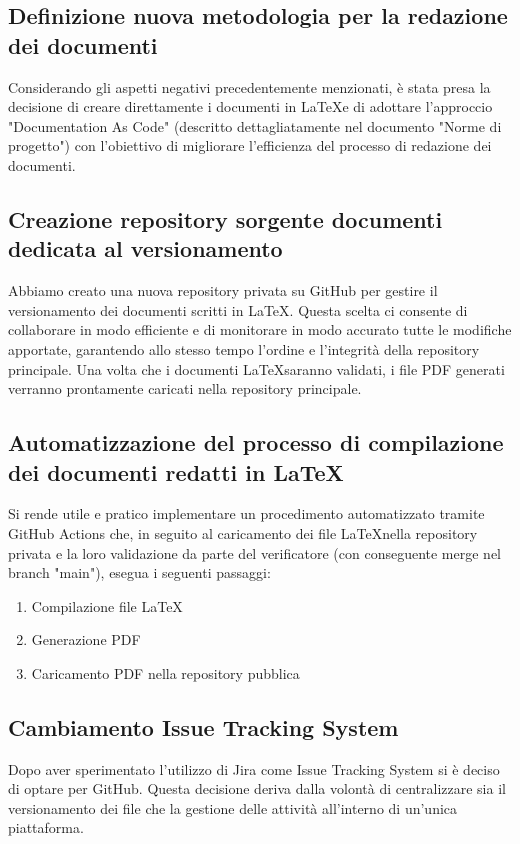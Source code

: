 \documentclass{article}
\begin{document}
    \subsection{Definizione nuova metodologia per la redazione dei documenti}
    Considerando gli aspetti negativi precedentemente menzionati, è stata presa la decisione di creare direttamente i documenti in \LaTeX e di adottare l'approccio "Documentation As Code" (descritto dettagliatamente nel documento "Norme di progetto") con l'obiettivo di migliorare l'efficienza del processo di redazione dei documenti.
    \subsection{Creazione repository sorgente documenti dedicata al versionamento}
    Abbiamo creato una nuova repository privata su GitHub per gestire il versionamento dei documenti scritti in \LaTeX. Questa scelta ci consente di collaborare in modo efficiente e di monitorare in modo accurato tutte le modifiche apportate, garantendo allo stesso tempo l'ordine e l'integrità della repository principale. Una volta che i documenti \LaTeX saranno validati, i file PDF generati verranno prontamente caricati nella repository principale.

    \subsection{Automatizzazione del processo di compilazione dei documenti redatti in \LaTeX}
    Si rende utile e pratico implementare un procedimento automatizzato tramite GitHub Actions che, in seguito al caricamento dei file \LaTeX nella repository privata e la loro validazione da parte del verificatore (con conseguente merge nel branch "main"), esegua i seguenti passaggi:
    \begin{enumerate}
        \item Compilazione file \LaTeX
        \item Generazione PDF
        \item Caricamento PDF nella repository pubblica        
    \end{enumerate}

    \subsection{Cambiamento Issue Tracking System}
    Dopo aver sperimentato l’utilizzo di Jira come Issue Tracking System si è deciso di optare per GitHub. Questa decisione deriva dalla volontà di centralizzare sia il versionamento dei file che la gestione delle attività all'interno di un'unica piattaforma.
\end{document}
